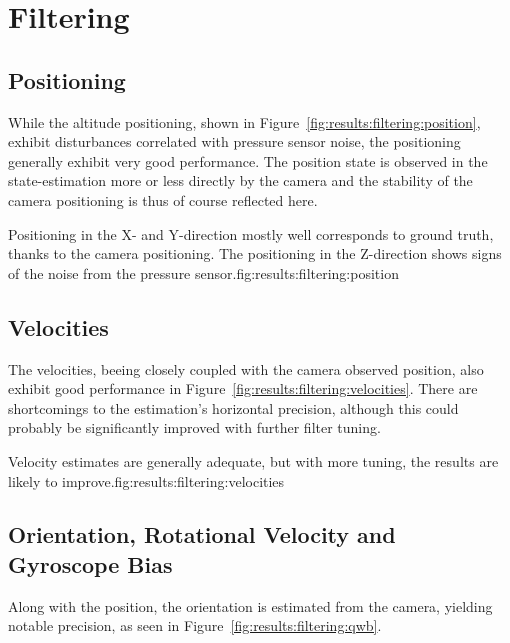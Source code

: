 \section{Filtering}
\label{sec:results:filtering}
\subsection{Positioning}
    While the altitude positioning, shown in Figure~\ref{fig:results:filtering:position},
    exhibit disturbances correlated with pressure sensor noise,
    the positioning generally exhibit very good performance. The position state
    is observed in the state-estimation more or less directly by the camera
    and the stability of the camera positioning is thus of course reflected here.
    \begin{subfigures}{Positioning in the X- and Y-direction mostly well corresponds to ground truth, thanks to the camera positioning.
    The positioning in the Z-direction shows signs of the noise from the pressure sensor.}{fig:results:filtering:position}
    \end{subfigures}

\subsection{Velocities}
    The velocities, beeing closely coupled with the camera observed position,
    also exhibit good performance in Figure~\ref{fig:results:filtering:velocities}.
    There are shortcomings to the estimation's horizontal precision, although
    this could probably be significantly improved with further filter tuning.
    \begin{subfigures}{Velocity estimates are generally adequate, but with more tuning, the results are likely to improve.}{fig:results:filtering:velocities}
    \end{subfigures}

\subsection{Orientation, Rotational Velocity and Gyroscope Bias}
    Along with the position, the orientation is estimated from the camera,
    yielding notable precision, as seen in Figure~\ref{fig:results:filtering:qwb}.

